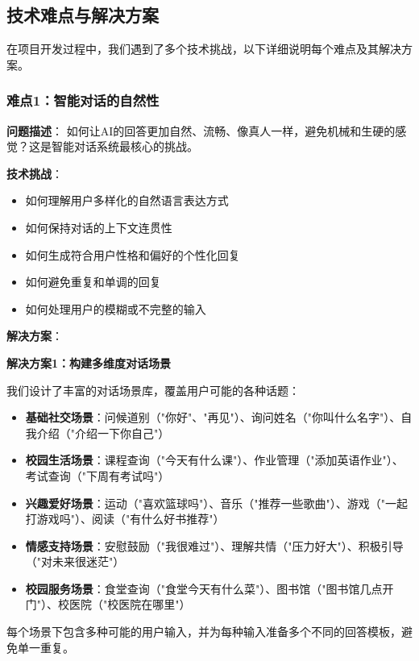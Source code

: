 \documentclass[12pt,a4paper]{article}
\begin{document}
\subsection{技术难点与解决方案}

在项目开发过程中，我们遇到了多个技术挑战，以下详细说明每个难点及其解决方案。

\subsubsection{难点1：智能对话的自然性}

\textbf{问题描述}：
如何让AI的回答更加自然、流畅、像真人一样，避免机械和生硬的感觉？这是智能对话系统最核心的挑战。

\textbf{技术挑战}：
\begin{itemize}
    \item 如何理解用户多样化的自然语言表达方式
    \item 如何保持对话的上下文连贯性
    \item 如何生成符合用户性格和偏好的个性化回复
    \item 如何避免重复和单调的回复
    \item 如何处理用户的模糊或不完整的输入
\end{itemize}

\textbf{解决方案}：

\textbf{解决方案1：构建多维度对话场景}

我们设计了丰富的对话场景库，覆盖用户可能的各种话题：

\begin{itemize}
    \item \textbf{基础社交场景}：问候道别（"你好"、"再见"）、询问姓名（"你叫什么名字"）、自我介绍（"介绍一下你自己"）
    \item \textbf{校园生活场景}：课程查询（"今天有什么课"）、作业管理（"添加英语作业"）、考试查询（"下周有考试吗"）
    \item \textbf{兴趣爱好场景}：运动（"喜欢篮球吗"）、音乐（"推荐一些歌曲"）、游戏（"一起打游戏吗"）、阅读（"有什么好书推荐"）
    \item \textbf{情感支持场景}：安慰鼓励（"我很难过"）、理解共情（"压力好大"）、积极引导（"对未来很迷茫"）
    \item \textbf{校园服务场景}：食堂查询（"食堂今天有什么菜"）、图书馆（"图书馆几点开门"）、校医院（"校医院在哪里"）
\end{itemize}

每个场景下包含多种可能的用户输入，并为每种输入准备多个不同的回答模板，避免单一重复。
\end{document}
